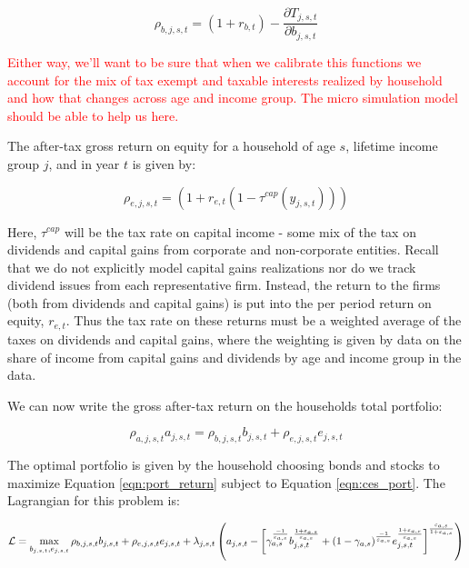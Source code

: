 \begin{equation}
\rho_{b,j,s,t}=(1+r_{b,t}) - \frac{\partial T_{j,s,t}}{\partial b_{j,s,t}}
\end{equation}

\textcolor{red}{Either way, we'll want to be sure that when we calibrate this functions we account for the mix of tax exempt and taxable interests realized by household and how that changes across age and income group.  The micro simulation model should be able to help us here.}


The after-tax gross return on equity for a household of age $s$, lifetime income group $j$, and in year $t$ is given by:

\begin{equation}
\rho_{e,j,s,t}=(1+r_{e,t}(1-\tau^{cap}(y_{j,s,t})))
\end{equation}

Here, $\tau^{cap}$ will be the tax rate on capital income - some mix of the tax on dividends and capital gains from corporate and non-corporate entities.  Recall that we do not explicitly model capital gains realizations nor do we track dividend issues from each representative firm.  Instead, the return to the firms (both from dividends and capital gains) is put into the per period return on equity, $r_{e,t}$.  Thus the tax rate on these returns must be a weighted average of the taxes on dividends and capital gains, where the weighting is given by data on the share of income from capital gains and dividends by age and income group in the data.

We can now write the gross after-tax return on the households total portfolio:

\begin{equation}
\label{eqn:port_return}
\rho_{a,j,s,t}a_{j,s,t}=\rho_{b,j,s,t}b_{j,s,t}+\rho_{e,j,s,t}e_{j,s,t}
\end{equation}

The optimal portfolio is given by the household choosing bonds and stocks to maximize Equation \ref{eqn:port_return} subject to Equation \ref{eqn:ces_port}.  The Lagrangian for this problem is:

\begin{equation}
\mathcal{L} =  \max_{b_{j,s,t},e_{j,s,t}} \rho_{b,j,s,t}b_{j,s,t} + \rho_{e,j,s,t}e_{j,s,t} + \lambda_{j,s,t}\left(a_{j,s,t} -  \left[\gamma_{a,s}^{\frac{-1}{\varepsilon_{a,s}}}b_{j,s,t}^{\frac{1+\varepsilon_{a.s}}{\varepsilon_{a,s}}}+(1-\gamma_{a,s})^{\frac{-1}{\varepsilon_{a,s}}}e_{j,s,t}^{\frac{1+\varepsilon_{a,s}}{\varepsilon_{a,s}}}\right]^{\frac{\varepsilon_{a,s}}{1+\varepsilon_{a,s}}}\right)
\end{equation}

